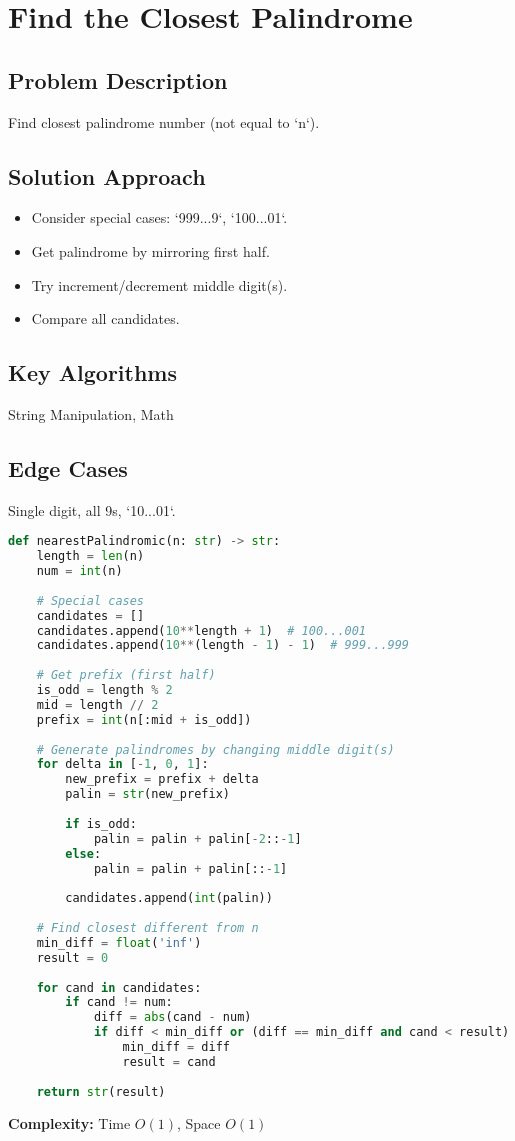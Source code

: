 \documentclass[10pt, a4paper]{article}
\begin{document}
\section{Find the Closest Palindrome}
\subsection*{Problem Description}
Find closest palindrome number (not equal to `n`).

\subsection*{Solution Approach}
\begin{itemize}
    \item Consider special cases: `999...9`, `100...01`.
    \item Get palindrome by mirroring first half.
    \item Try increment/decrement middle digit(s).
    \item Compare all candidates.
\end{itemize}

\subsection*{Key Algorithms}
String Manipulation, Math

\subsection*{Edge Cases}
Single digit, all 9s, `10...01`.

\begin{lstlisting}[language=Python]
def nearestPalindromic(n: str) -> str:
    length = len(n)
    num = int(n)
    
    # Special cases
    candidates = []
    candidates.append(10**length + 1)  # 100...001
    candidates.append(10**(length - 1) - 1)  # 999...999
    
    # Get prefix (first half)
    is_odd = length % 2
    mid = length // 2
    prefix = int(n[:mid + is_odd])
    
    # Generate palindromes by changing middle digit(s)
    for delta in [-1, 0, 1]:
        new_prefix = prefix + delta
        palin = str(new_prefix)
        
        if is_odd:
            palin = palin + palin[-2::-1]
        else:
            palin = palin + palin[::-1]
        
        candidates.append(int(palin))
    
    # Find closest different from n
    min_diff = float('inf')
    result = 0
    
    for cand in candidates:
        if cand != num:
            diff = abs(cand - num)
            if diff < min_diff or (diff == min_diff and cand < result):
                min_diff = diff
                result = cand
    
    return str(result)
\end{lstlisting}
\textbf{Complexity:} Time $O(1)$, Space $O(1)$
\end{document}
